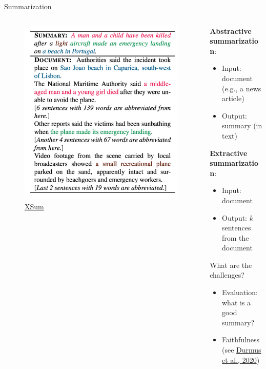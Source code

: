 \documentclass[usenames,dvipsnames,notes,11pt,aspectratio=169,hyperref={colorlinks=true, linkcolor=blue}]{beamer}
\begin{document}
\begin{frame}
    {Summarization}
    \begin{columns}
        \begin{column}{0.5\textwidth}
            \begin{figure}
                \includegraphics[height=0.8\textwidth]{figures/xsum}
                \caption{\href{https://aclanthology.org/D18-1206.pdf}{XSum}}
            \end{figure}
        \end{column}
        \begin{column}{0.5\textwidth}
            \textbf{Abstractive summarization}:\\
            \begin{itemize}
                \item[] Input: document (e.g., a news article)
                \item[] Output: summary (in text)
            \end{itemize}
            
            \medskip
            \textbf{Extractive summarization}:\\
            \begin{itemize}
                \item[] Input: document 
                \item[] Output: $k$ sentences from the document 
            \end{itemize}

            \bigskip
            What are the challenges?\\\pause
            \begin{itemize}
                \item Evaluation: what is a good summary?
                \item Faithfulness (see \href{https://arxiv.org/abs/2005.03754}{Durmus et al., 2020})
            \end{itemize}
        \end{column}
    \end{columns}
\end{frame}
\end{document}
